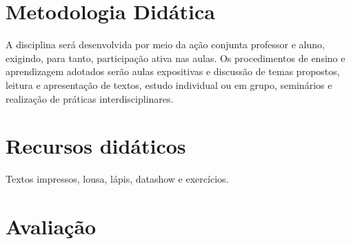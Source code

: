 \documentclass[
]{book}
\begin{document}
\hypertarget{metodologia-diduxe1tica-1}{%
\section{Metodologia Didática}\label{metodologia-diduxe1tica-1}}

A disciplina será desenvolvida por meio da ação conjunta professor e aluno, exigindo, para tanto, participação ativa nas aulas. Os procedimentos de ensino e aprendizagem adotados serão aulas expositivas e discussão de temas propostos, leitura e apresentação de textos, estudo individual ou em grupo, seminários e realização de práticas interdisciplinares.

\hypertarget{recursos-diduxe1ticos-1}{%
\section{Recursos didáticos}\label{recursos-diduxe1ticos-1}}

Textos impressos, lousa, lápis, datashow e exercícios.

\hypertarget{avaliauxe7uxe3o-1}{%
\section{Avaliação}\label{avaliauxe7uxe3o-1}}
\end{document}
